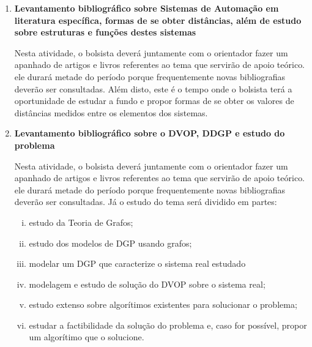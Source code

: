 \documentclass[11pt]{article}
\begin{document}
	\begin{enumerate}[(1)]
		
	\item {\bf Levantamento bibliográfico sobre Sistemas de Automação em literatura específica, formas de se obter distâncias, além de estudo sobre estruturas e funções destes sistemas}
	
	\vspace{0.2cm}
	
	Nesta atividade, o bolsista deverá juntamente com o orientador fazer um apanhado de artigos e livros referentes ao tema que servirão de apoio teórico. ele durará metade do período porque frequentemente novas bibliografias deverão ser consultadas. Além disto, este é o tempo onde o bolsista terá a oportunidade de estudar a fundo e propor formas de se obter os valores de distâncias medidos entre os elementos dos sistemas.
	
	\item {\bf Levantamento bibliográfico sobre o DVOP, DDGP e estudo do problema}
	
	\vspace{0.2cm}
	
	Nesta atividade, o bolsista deverá juntamente com o orientador fazer um apanhado de artigos e livros referentes ao tema que servirão de apoio teórico. ele durará metade do período porque frequentemente novas bibliografias deverão ser consultadas. Já o estudo do tema será dividido em partes: 
	
	\begin{enumerate}[(i)]
		\item estudo da Teoria de Grafos;
		
		\item estudo dos modelos de DGP usando grafos;
		
		\item modelar um DGP que caracterize o sistema real estudado
		
		\item modelagem e estudo de solução do DVOP sobre o sistema real;
		
		\item estudo extenso sobre algorítimos existentes para solucionar o problema;
		
		\item estudar a factibilidade da solução do problema e, caso for possível, propor um algorítimo que o solucione.
		
	\end{enumerate}
	

\end{enumerate}
\end{document}
